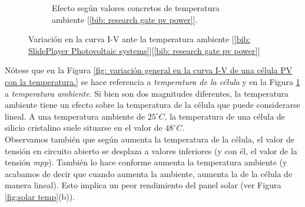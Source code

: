\documentclass[12pt]{article}
\begin{document}
\begin{figure}[h!]
\begin{subfigure}{0.55\textwidth}
			\caption{Efecto según valores concretos de temperatura ambiente [\ref{bib: research gate pv power}].}
			\label{fig:variación con valores en la curva I-V de una célula PV con la temperatura.}
		\end{subfigure}
		\caption{Variación en la curva I-V ante la temperatura ambiente [\ref{bib: SlidePlayer Photovoltaic systems}][\ref{bib: research gate pv power}]}
		\label{fig:variación I-V temperatura}
	\end{figure}
	
	\noindent Nótese que en la Figura \ref{fig: variación general en la curva I-V de una célula PV con la temperatura.} se hace referencia a \textit{temperatura de la célula} y en la Figura \ref{fig:variación con valores en la curva I-V de una célula PV con la temperatura.} a \textit{temperatura ambiente}. Si bien son dos magnitudes diferentes, la temperatura ambiente tiene un efecto sobre la temperatura de la célula que puede considerarse lineal. A una temperatura ambiente de $25^{\circ}C$, la temperatura de una célula de silicio cristalino suele situarse en el valor de $48^{\circ}C$. \\
	
	\noindent Observamos también que según aumenta la temperatura de la célula, el valor de tensión en circuito abierto se desplaza a valores inferiores (y con él, el valor de la tensión \textit{mpp}). También lo hace conforme aumenta la temperatura ambiente (y acabamos de decir que cuando aumenta la ambiente, aumenta la de la célula de manera lineal). Esto implica un peor rendimiento del panel solar (ver Figura \ref{fig:solar temp}(b)).
	
\end{document}
